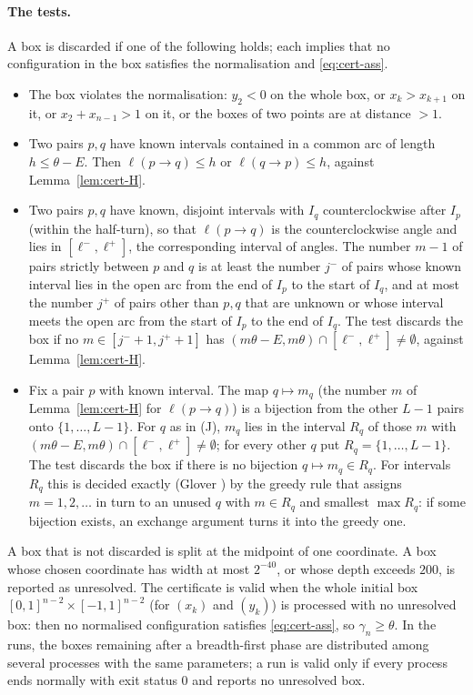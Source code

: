 \paragraph{The tests.} A box is discarded if one of the following holds; each implies that no configuration
in the box satisfies the normalisation and \eqref{eq:cert-ass}.
\begin{itemize}
  \item[(D)] The box violates the normalisation: $y_2<0$ on the whole box, or $x_k>x_{k+1}$ on it, or
    $x_2+x_{n-1}>1$ on it, or the boxes of two points are at distance $>1$.
  \item[(P)] Two pairs $p,q$ have known intervals contained in a common arc of length $h\le\theta-E$. Then
    $\ell(p\to q)\le h$ or $\ell(q\to p)\le h$, against Lemma~\ref{lem:cert-H}.
  \item[(J)] Two pairs $p,q$ have known, disjoint intervals with $I_q$ counterclockwise after $I_p$ (within
    the half-turn), so that $\ell(p\to q)$ is the counterclockwise angle and lies in $[\ell^-,\ell^+]$, the
    corresponding interval of angles. The number $m-1$ of pairs strictly between $p$ and $q$ is at least the
    number $j^-$ of pairs whose known interval lies in the open arc from the end of $I_p$ to the start of $I_q$,
    and at most the number $j^+$ of pairs other than $p,q$ that are unknown or whose interval meets the open arc from the start of
    $I_p$ to the end of $I_q$. The test discards the box if no
    $m\in[j^-+1,j^++1]$ has $(m\theta-E,m\theta)\cap[\ell^-,\ell^+]\ne\emptyset$, against
    Lemma~\ref{lem:cert-H}.
  \item[(M)] Fix a pair $p$ with known interval. The map $q\mapsto m_q$ (the number $m$ of
    Lemma~\ref{lem:cert-H} for $\ell(p\to q)$) is a bijection from the other $L-1$ pairs onto $\{1,\dots,L-1\}$.
    For $q$ as in (J), $m_q$ lies in the interval $R_q$ of those $m$ with
    $(m\theta-E,m\theta)\cap[\ell^-,\ell^+]\ne\emptyset$; for every other $q$ put $R_q=\{1,\dots,L-1\}$. The test
    discards the box if there is no bijection $q\mapsto m_q\in R_q$. For intervals $R_q$ this is decided exactly
    (Glover \cite{Glover}) by the greedy rule that assigns $m=1,2,\dots$ in turn to an unused $q$ with $m\in R_q$ and smallest
    $\max R_q$: if some bijection exists, an exchange argument turns it into the greedy one.
\end{itemize}
A box that is not discarded is split at the midpoint of one coordinate. A box whose chosen coordinate has
width at most $2^{-40}$, or whose depth exceeds $200$, is reported as unresolved. The certificate is valid
when the whole initial box $[0,1]^{n-2}\times[-1,1]^{n-2}$ (for $(x_k)$ and $(y_k)$) is processed with no
unresolved box: then no normalised configuration satisfies \eqref{eq:cert-ass}, so $\gamma_n\ge\theta$. In the runs,
the boxes remaining after a breadth-first phase are distributed among several processes with the same
parameters; a run is valid only if every process ends normally with exit status $0$ and reports no unresolved box.

